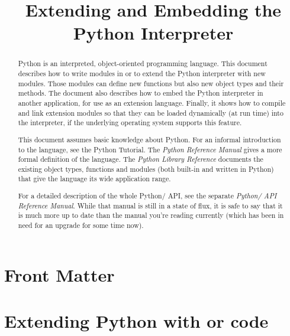 \documentclass{manual}
\title{Extending and Embedding the Python Interpreter}
\begin{document}
\maketitle

\ifhtml
\chapter*{Front Matter\label{front}}
\fi



\begin{abstract}

\noindent
Python is an interpreted, object-oriented programming language.  This
document describes how to write modules in \C{} or \Cpp{} to extend the
Python interpreter with new modules.  Those modules can define new
functions but also new object types and their methods.  The document
also describes how to embed the Python interpreter in another
application, for use as an extension language.  Finally, it shows how
to compile and link extension modules so that they can be loaded
dynamically (at run time) into the interpreter, if the underlying
operating system supports this feature.

This document assumes basic knowledge about Python.  For an informal
introduction to the language, see the Python Tutorial.  The \emph{Python
Reference Manual} gives a more formal definition of the language.  The
\emph{Python Library Reference} documents the existing object types,
functions and modules (both built-in and written in Python) that give
the language its wide application range.

For a detailed description of the whole Python/\C{} API, see the separate
\emph{Python/\C{} API Reference Manual}.   While that
manual is still in a state of flux, it is safe to say that it is much
more up to date than the manual you're reading currently (which has
been in need for an upgrade for some time now).


\end{abstract}

\tableofcontents


\chapter{Extending Python with \C{} or \Cpp{} code}


\label{intro}
\end{document}
